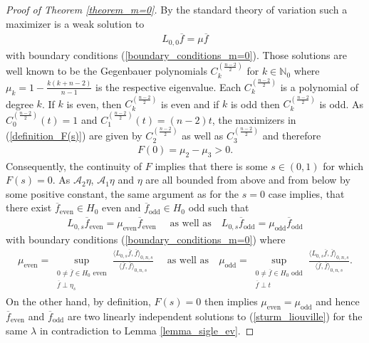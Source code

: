 \documentclass[12pt,twoside]{amsart}
\numberwithin{satz}{section}
\theoremstyle{definition}
\numberwithin{equation}{section}
\newcommand\N{\mathbb{N}}
\begin{document}
\begin{proof}[Proof of Theorem \ref{theorem_m=0}]
		By the standard theory of variation such a maximizer is a weak solution to
		\begin{align*}
			L_{0,0}\overline{f}=\mu \overline{f}
		\end{align*}
		with boundary conditions (\ref{boundary_conditions_m=0}). Those solutions are well known to be the Gegenbauer polynomials $C^{\left(\frac{n-2}{2}\right)}_k$ for $k\in\N_0$ where $\mu_k=1-\frac{k(k+n-2)}{n-1}$ is the respective eigenvalue. Each $C^{\left(\frac{n-2}{2}\right)}_k$ is a polynomial of degree $k$. If $k$ is even, then $C^{\left(\frac{n-2}{2}\right)}_k$ is even and if $k$ is odd then $C^{\left(\frac{n-2}{2}\right)}_k$ is odd. As $C^{\left(\frac{n-2}{2}\right)}_0(t)=1$ and $C^{\left(\frac{n-2}{2}\right)}_1(t)=(n-2)t$, the maximizers in (\ref{definition_F(s)}) are given by $C^{\left(\frac{n-2}{2}\right)}_2$ as well as $C^{\left(\frac{n-2}{2}\right)}_3$ and therefore
		\begin{align*}
			F(0)= \mu_2 - \mu_3 > 0.
		\end{align*}
		Consequently, the continuity of $F$ implies that there is some $s\in(0,1)$ for which $F(s)=0$. As $\mathcal{A}_2\eta$, $\mathcal{A}_1\eta$ and $\eta$ are all bounded from above and from below by some positive constant, the same argument as for the $s=0$ case implies, that there exist $\overline{f}_{\text{even}}\in H_0$ even and $\overline{f}_{\text{odd}}\in H_0$ odd such that
		\begin{align*}
			L_{0,s}\overline{f}_{\text{even}}=\mu_{\text{even}}\overline{f}_{\text{even}} \quad \text{ as well as} \quad L_{0,s}\overline{f}_{\text{odd}}=\mu_{\text{odd}}\overline{f}_{\text{odd}}
		\end{align*}
		with boundary conditions (\ref{boundary_conditions_m=0}) where
		\begin{align*}
			\mu_{\text{even}}=\sup_{\substack{0\neq\overline{f}\in H_0 \text{ even}\\ \overline{f}\perp \eta_s}} \frac{\langle L_{0,s}\overline{f},\overline{f}\rangle_{0,n,s}}{\langle \overline{f},\overline{f}\rangle_{0,n,s}} \quad \text{ as well as} \quad \mu_{\text{odd}} = \sup_{\substack{0\neq\overline{f}\in H_0 \text{ odd}\\ \overline{f}\perp t}} \frac{\langle L_{0,s}\overline{f},\overline{f}\rangle_{0,n,s}}{\langle \overline{f},\overline{f}\rangle_{0,n,s}}.
		\end{align*}
		On the other hand, by definition, $F(s)=0$ then implies $\mu_{\text{even}}=\mu_{\text{odd}}$ and hence $\overline{f}_{\text{even}}$ and $\overline{f}_{\text{odd}}$ are two linearly independent solutions to (\ref{sturm_liouville}) for the same $\lambda$ in contradiction to Lemma \ref{lemma_sigle_ev}.	
	\end{proof}
\end{document}
